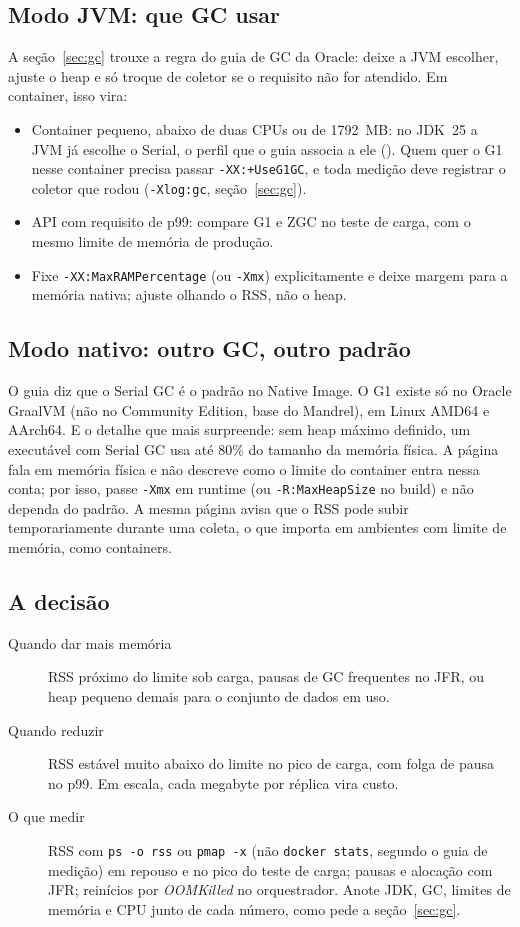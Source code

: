 \subsection*{Modo JVM: que GC usar}

A seção~\ref{sec:gc} trouxe a regra do guia de GC da Oracle: deixe a JVM
escolher, ajuste o heap e só troque de coletor se o requisito não for
atendido. Em container, isso vira:
\begin{itemize}
\item Container pequeno, abaixo de duas CPUs ou de 1792~MB: no JDK~25
  a JVM já escolhe o Serial, o perfil que o guia associa a ele
  (). Quem quer o G1 nesse container
  precisa passar \texttt{-XX:+UseG1GC}, e toda medição deve registrar o
  coletor que rodou (\texttt{-Xlog:gc}, seção~\ref{sec:gc}).
\item API com requisito de p99: compare G1 e ZGC no teste de carga,
  com o mesmo limite de memória de produção.
\item Fixe \texttt{-XX:MaxRAMPercentage} (ou \texttt{-Xmx}) explicitamente
  e deixe margem para a memória nativa; ajuste olhando o RSS, não o heap.
\end{itemize}

\subsection*{Modo nativo: outro GC, outro padrão}

O guia  diz que o Serial GC é o padrão no
Native Image. O G1 existe só no Oracle GraalVM (não no Community
Edition, base do Mandrel), em Linux AMD64 e AArch64. E o detalhe que mais
surpreende: sem heap máximo definido, um executável com Serial GC usa
até 80\% do tamanho da memória física. A página fala em memória física e
não descreve como o limite do container entra nessa conta; por isso,
passe \texttt{-Xmx} em runtime (ou \texttt{-R:MaxHeapSize} no build) e
não dependa do padrão. A mesma página avisa que o RSS pode subir
temporariamente durante uma coleta, o que importa em ambientes com
limite de memória, como containers.

\subsection*{A decisão}

\begin{description}
\item[Quando dar mais memória] RSS próximo do limite sob carga, pausas de
  GC frequentes no JFR, ou heap pequeno demais para o conjunto de dados
  em uso.
\item[Quando reduzir] RSS estável muito abaixo do limite no pico de
  carga, com folga de pausa no p99. Em escala, cada megabyte por réplica
  vira custo.
\item[O que medir] RSS com \texttt{ps -o rss} ou \texttt{pmap -x} (não
  \texttt{docker stats}, segundo o guia de medição) em repouso e no pico
  do teste de carga; pausas e alocação com JFR; reinícios por
  \emph{OOMKilled} no orquestrador. Anote JDK, GC, limites de memória e
  CPU junto de cada número, como pede a seção~\ref{sec:gc}.
\end{description}
